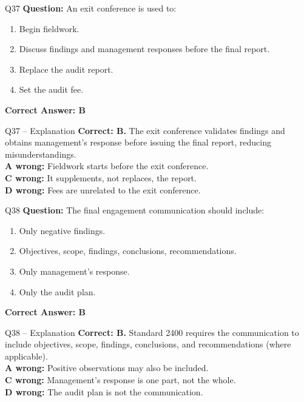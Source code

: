 \documentclass[aspectratio=169,10pt]{beamer}
\begin{document}
	\begin{frame}[t]{Q37}
		\small
		\textbf{Question:} An exit conference is used to:
		\begin{enumerate}[label=\Alph*.,itemsep=1pt,topsep=2pt]
			\item Begin fieldwork.
			\item Discuss findings and management responses before the final report.
			\item Replace the audit report.
			\item Set the audit fee.
		\end{enumerate}
		\vspace{4pt}
		\textbf{Correct Answer: B}
	\end{frame}
	
	\begin{frame}[t]{Q37 -- Explanation}
		\small
		\textbf{Correct: B.} The exit conference validates findings and obtains management's response before issuing the final report, reducing misunderstandings. \\[4pt]
		\textbf{A wrong:} Fieldwork starts before the exit conference. \\[2pt]
		\textbf{C wrong:} It supplements, not replaces, the report. \\[2pt]
		\textbf{D wrong:} Fees are unrelated to the exit conference.
	\end{frame}
	
	\begin{frame}[t]{Q38}
		\small
		\textbf{Question:} The final engagement communication should include:
		\begin{enumerate}[label=\Alph*.,itemsep=1pt,topsep=2pt]
			\item Only negative findings.
			\item Objectives, scope, findings, conclusions, recommendations.
			\item Only management's response.
			\item Only the audit plan.
		\end{enumerate}
		\vspace{4pt}
		\textbf{Correct Answer: B}
	\end{frame}
	
	\begin{frame}[t]{Q38 -- Explanation}
		\small
		\textbf{Correct: B.} Standard 2400 requires the communication to include objectives, scope, findings, conclusions, and recommendations (where applicable). \\[4pt]
		\textbf{A wrong:} Positive observations may also be included. \\[2pt]
		\textbf{C wrong:} Management's response is one part, not the whole. \\[2pt]
		\textbf{D wrong:} The audit plan is not the communication.
	\end{frame}
	
\end{document}
